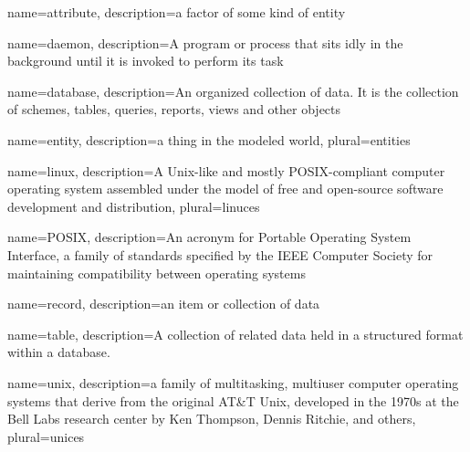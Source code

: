  {
    name=attribute,
    description={a factor of some kind of entity}
}

 {
    name=daemon,
    description={A program or process that sits idly in the background until it
    is invoked to perform its task}
}

 {
    name=database,
    description={An organized collection of data. It is the collection of
    schemes, tables, queries, reports, views and other objects}
}

 {
    name=entity,
    description={a thing in the modeled world},
    plural=entities
}


 {
    name=linux,
    description={A Unix-like and mostly POSIX-compliant computer operating
    system assembled under the model of free and open-source software
    development and distribution}, 
    plural=linuces
}


 {
    name=POSIX,
    description={An acronym for Portable Operating System Interface, a family of
    standards specified by the IEEE Computer Society for maintaining
    compatibility between operating systems}
}

 {
    name=record,
    description={an item or collection of data}
}

 {
    name=table,
    description={A collection of related data held in a structured format within
    a database.} 
}


 {
    name=unix,
    description={a family of multitasking, multiuser computer operating systems
    that derive from the original AT\&T Unix, developed in the 1970s at the Bell
    Labs research center by Ken Thompson, Dennis Ritchie, and others},
    plural=unices    
}


